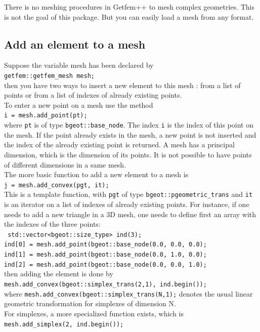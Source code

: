 \documentclass[11pt,a4paper]{article}
\begin{document}
There is no meshing procedures in {\sc Getfem++} to mesh complex geometries. This is not the goal of this package. But you can easily load a mesh from any format.

\subsection{Add an element to a mesh}
Suppose the variable mesh has been declared by\\[0.5cm]
{\tt getfem::getfem\_mesh mesh;}\\[0.5cm]
then you have two ways to insert a new element to this mesh : from a list of points or from a list of indexes of already existing points.\\[0.5cm]
To enter a new point on a mesh use the method\\[0.5cm]
{\tt i = mesh.add\_point(pt);}\\[0.5cm]
where {\tt pt} is of type {\tt bgeot::base\_node}. The index {\tt i} is the index of this point on the mesh. If the point already exists in the mesh, a new point is not inserted and the index of the already existing point is returned. A mesh has a principal dimension, which is the dimension of its points. It is not possible to have points of different dimensions in a same mesh.\\[0.5cm]
The more basic function to add a new element to a mesh is\\[0.5cm]
{\tt j = mesh.add\_convex(pgt, it);}\\[0.5cm]
This is a template function, with {\tt pgt} of type {\tt bgeot::pgeometric\_trans} and {\tt it} is an iterator on a list of indexes of already existing points. For instance, if one needs to add a new triangle in a 3D mesh, one needs to define first an array with the indexes of the three points:\\[0.5cm]
{\tt 
  std::vector<bgeot::size\_type> ind(3); \\
  ind[0] = mesh.add\_point(bgeot::base\_node(0.0, 0.0, 0.0);\\
  ind[1] = mesh.add\_point(bgeot::base\_node(0.0, 1.0, 0.0);\\
  ind[2] = mesh.add\_point(bgeot::base\_node(0.0, 0.0, 1.0);
}\\[0.5cm]
then adding the element is done by\\[0.5cm]
{\tt mesh.add\_convex(bgeot::simplex\_trans(2,1), ind.begin()); }\\[0.5cm]
where {\tt mesh.add\_convex(bgeot::simplex\_trans(N,1);} denotes the usual linear geometric transformation for simplexes of dimension N.\\[0.5cm]
For simplexes, a more specialized function exists, which is\\[0.5cm]
{\tt mesh.add\_simplex(2, ind.begin()); }\\[0.5cm]
\end{document}
